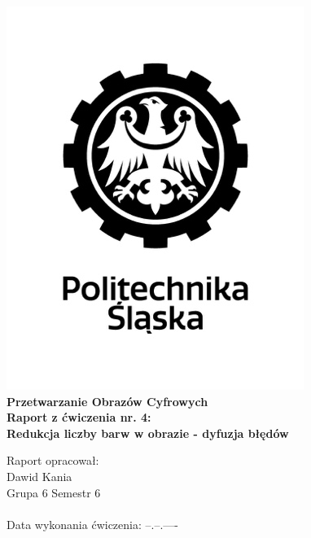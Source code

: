 
\begin{titlepage}
    \begin{center}
        \includegraphics[width=.50\linewidth]{other/polsl.png}\\
        \Huge
        \textbf{Przetwarzanie Obrazów Cyfrowych}
        \\ \vspace{1.5cm}
        \Large
        \textbf{Raport z ćwiczenia nr. 4: } \\
        \textbf{Redukcja liczby barw w obrazie - dyfuzja błędów}       
    \end{center}
    \vspace{3.0cm}
    \Large
    Raport opracował: \\
    Dawid Kania \\
    Grupa 6 Semestr 6 \\ \\
    Data wykonania ćwiczenia: --.--.----
\end{titlepage}

